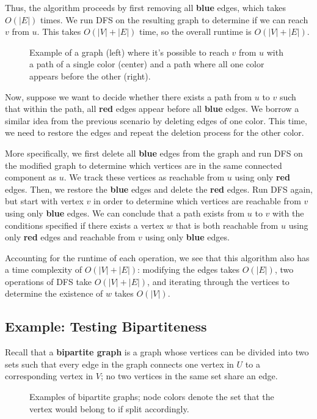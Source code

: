 \documentclass[11pt]{article}
\begin{document}
Thus, the algorithm proceeds by first removing all \textcolor{DeepSkyBlue3}{\textbf{blue}} edges, which takes $O(|E|)$ times. We run DFS on the resulting graph to determine if we can reach $v$ from $u$. This takes $O(|V| + |E|)$ time, so the overall runtime is $O(|V| + |E|)$.  

\begin{figure}[H]
    \centering
    
    \caption{Example of a graph (left) where it's possible to reach $v$ from $u$ with a path of a single color (center) and a path where all one color appears before the other (right).}
\end{figure}

Now, suppose we want to decide whether there exists a path from $u$ to $v$ such that within the path, all \textcolor{Maroon0}{\textbf{red}} edges appear before all \textcolor{DeepSkyBlue3}{\textbf{blue}} edges. We borrow a similar idea from the previous scenario by deleting edges of one color. This time, we need to restore the edges and repeat the deletion process for the other color. 

More specifically, we first delete all \textcolor{DeepSkyBlue3}{\textbf{blue}} edges from the graph and run DFS on the modified graph to determine which vertices are in the same connected component as $u$. We track these vertices as reachable from $u$ using only \textcolor{Maroon0}{\textbf{red}} edges. Then, we restore the \textcolor{DeepSkyBlue3}{\textbf{blue}} edges and delete the \textcolor{Maroon0}{\textbf{red}} edges. Run DFS again, but start with vertex $v$ in order to determine which vertices are reachable from $v$ using only \textcolor{DeepSkyBlue3}{\textbf{blue}} edges. We can conclude that a path exists from $u$ to $v$ with the conditions specified if there exists a vertex $w$ that is both reachable from $u$ using only \textcolor{Maroon0}{\textbf{red}} edges and reachable from $v$ using only \textcolor{DeepSkyBlue3}{\textbf{blue}} edges. 

Accounting for the runtime of each operation, we see that this algorithm also has a time complexity of $O(|V| + |E|)$: modifying the edges takes $O(|E|)$, two operations of DFS take $O(|V| + |E|)$, and iterating through the vertices to determine the existence of $w$ takes $O(|V|)$. 

\subsection{Example: Testing Bipartiteness}
Recall that a \textbf{bipartite graph} is a graph whose vertices can be divided into two sets such that every edge in the graph connects one vertex in $U$ to a corresponding vertex in $V$; no two vertices in the same set share an edge. 
\begin{figure}[H]
    \centering 
    
    \caption{Examples of bipartite graphs; node colors denote the set that the vertex would belong to if split accordingly.}
\end{figure} 
\end{document}
